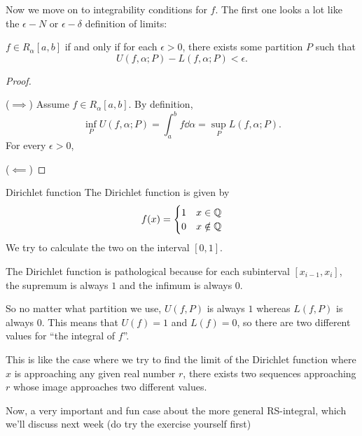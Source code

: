 Now we move on to integrability conditions for $f$. The first one looks a lot like the $\epsilon-N$ or $\epsilon-\delta$ definition of limits:

\begin{theorem}
$f\in R_\alpha[a,b]$ if and only if for each $\epsilon>0$, there exists some partition $P$ such that
\[ U(f,\alpha;P)-L(f,\alpha;P)<\epsilon. \]
\end{theorem}

\begin{proof} \

($\implies$) Assume $f\in R_\alpha[a,b]$. By definition,
\[ \inf_PU(f,\alpha;P)=\int_a^bf\dd{\alpha}=\sup_PL(f,\alpha;P). \]
For every $\epsilon>0$, 

($\impliedby$) 
\end{proof}




\begin{exmp}{Dirichlet function}{}
The Dirichlet function is given by
\[ f(x)=\begin{cases}
1 & x\in\mathbb Q \\
0 & x\notin\mathbb Q
\end{cases} \]
We try to calculate the two on the interval $[0,1]$.

The Dirichlet function is pathological because for each subinterval $[x_{i-1},x_i]$, the supremum is always $1$ and the infimum is always $0$.

So no matter what partition we use, $U(f,P)$ is always $1$ whereas $L(f,P)$ is always $0$. This means that $U(f)=1$ and $L(f)=0$, so there are two different values for ``the integral of $f$''.

This is like the case where we try to find the limit of the Dirichlet function where $x$ is approaching any given real number $r$, there exists two sequences approaching $r$ whose image approaches two different values.
\end{exmp}

Now, a very important and fun case about the more general RS-integral, which we'll discuss next week (do try the exercise yourself first)


